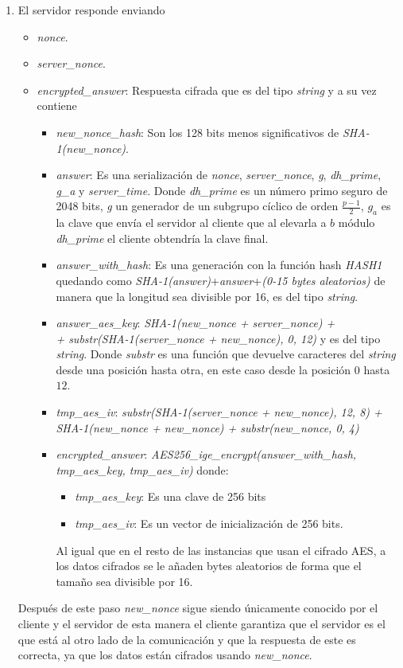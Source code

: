 \begin{enumerate}
	\item El servidor responde enviando
		\begin{itemize}
			\item \emph{nonce}.
			\item \emph{server\_nonce}.
			\item \emph{encrypted\_answer}: Respuesta cifrada que es del tipo \emph{string} y a su vez contiene
			\begin{itemize}
				\item \emph{new\_nonce\_hash}: Son los 128 bits menos significativos de \emph{SHA-1(new\_nonce)}.
				\item \emph{answer}: Es una serialización de \emph{nonce}, \emph{server\_nonce}, \emph{g}, \emph{dh\_prime}, \emph{g\_a} y \emph{server\_time}. Donde \emph{dh\_prime} es un número primo seguro de 2048 bits, \emph{g} un generador de un subgrupo cíclico de orden $\frac{p-1}{2}$, $g_a$ es la clave que envía el servidor al cliente que al elevarla a $b$ módulo \emph{dh\_prime} el cliente obtendría la clave final.
\item \emph{answer\_with\_hash}: Es una generación con la función hash \emph{HASH1} quedando como \emph{SHA-1(answer)}+\emph{answer}+\emph{(0-15 bytes aleatorios)} de manera que la longitud sea divisible por 16, es del tipo \emph{string}.
				\item \emph{answer\_aes\_key}: \emph{SHA-1(new\_nonce + server\_nonce) +\\+ substr(SHA-1(server\_nonce + new\_nonce), 0, 12)} y es del tipo \emph{string}. Donde \emph{substr} es una función que devuelve caracteres del \emph{string} desde una posición hasta otra, en este caso desde la posición $0$ hasta $12$.
				\item \emph{tmp\_aes\_iv}: \emph{substr(SHA-1(server\_nonce + new\_nonce), 12, 8) + SHA-1(new\_nonce + new\_nonce) + substr(new\_nonce, 0, 4)}
				\item \emph{encrypted\_answer}: \emph{AES256\_ige\_encrypt(answer\_with\_hash,\\ tmp\_aes\_key, tmp\_aes\_iv)} donde:
				\begin{itemize}
					\item \emph{tmp\_aes\_key}: Es una clave de 256 bits
					\item \emph{tmp\_aes\_iv}: Es un vector de inicialización de 256 bits.
				\end{itemize}
				Al igual que en el resto de las instancias que usan el cifrado AES, a los datos cifrados se le añaden bytes aleatorios de forma que el tamaño sea divisible por 16.
			\end{itemize}
		\end{itemize}
	Después de este paso \emph{new\_nonce} sigue siendo únicamente conocido por el cliente y el servidor de esta manera el cliente garantiza que el servidor es el que está al otro lado de la comunicación y que la respuesta de este es correcta, ya que los datos están cifrados usando \emph{new\_nonce}.


\end{enumerate}
